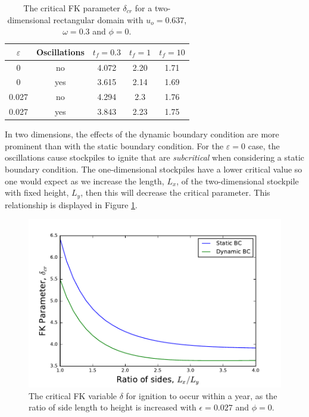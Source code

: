 \begin{table}[h!]
\caption{The critical FK parameter $\delta_{cr}$ for a two-dimensional rectangular domain with $u_o=0.637$, $\omega=0.3$ and $\phi=0$.}
\centering
\begin{tabular}{|c|c|c|c|c|}
\hline
$\varepsilon$ & Oscillations & $t_f=0.3$ & $t_f=1$ & $t_f=10$ \\ \hline
0 & no & 4.072 & 2.20 & 1.71  \\ \hline
0 & yes & 3.615 & 2.14 & 1.69  \\ \hline
0.027 & no & 4.294 & 2.3 & 1.76  \\ \hline
0.027 & yes & 3.843 & 2.23 & 1.75  \\ \hline
\end{tabular}
\label{2ddelt}
\end{table}  
In two dimensions, the effects of the dynamic boundary condition are more prominent than with the static boundary condition. For the $\varepsilon=0$ case, the oscillations cause stockpiles to ignite that are \textit{subcritical} when considering a static boundary condition. The one-dimensional stockpiles have a lower critical value so one would expect as we increase the length, $L_x$, of the two-dimensional stockpile with fixed height, $L_y$, then this will decrease the critical parameter. This relationship is displayed in Figure \ref{ratio}.
\begin{figure}[h!]
\centering
\includegraphics[scale=0.8]{figures/NDA/PBC/deltavslength_both.pdf} 
\caption{The critical FK variable $\delta$ for ignition to occur within a year, as the ratio of side length to height is increased with $\epsilon=0.027$ and $\phi=0$.}
\label{ratio}
\end{figure}
